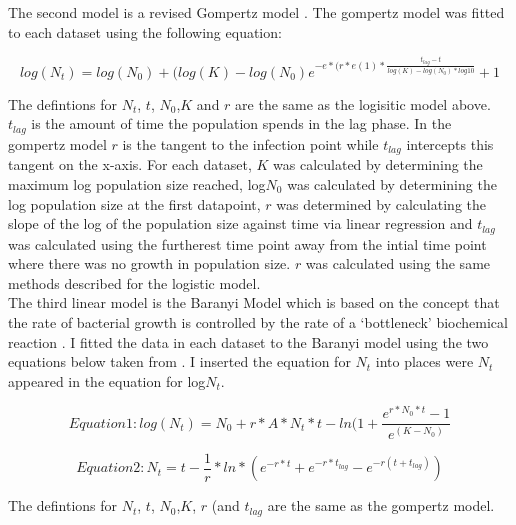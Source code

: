 \documentclass[titlepage]{article}
\begin{document}
The second model is a revised Gompertz model \cite{grijspeerdt1999estimating}. The gompertz model was fitted to each dataset using the following equation: 
  
  
    \begin{equation}
  log(N_{t}) = log(N_{0}) + (log(K) - log(N_{0})e^{-e*(r*e(1)*\frac{t_{lag} - t}{log(K) - log(N_{0})*log{10}}} +1
   \end{equation}
  
  
The defintions for \(N_{t}\), \(t\), \(N_{0}\),\(K\) and \(r\) are the same as the logisitic model above. \(t_{lag}\) is the amount of time the population spends in the lag phase. In the gompertz model \(r\) is the tangent to the infection point while \(t_{lag}\) intercepts this tangent on the x-axis. For each dataset, \(K\) was calculated by determining the maximum log population size reached, log\(N_{0}\) was calculated by determining the log population size at the first datapoint, \(r\) was determined by calculating the slope of the log of the population size against time via linear regression and \(t_{lag}\) was calculated using the furtherest time point away from the intial time point where there was no growth in population size. \(r\) was calculated using the same methods described for the logistic model. \\


The third linear model is the Baranyi Model \cite{baranyi1994dynamic} which is based on the concept that the  rate of  bacterial growth is controlled  by the rate of a ‘bottleneck’ biochemical reaction \cite{buchanan1997simple}. I fitted the data in each dataset to the Baranyi model using the two equations below taken from \cite{pla2015comparison}. I inserted the equation for \(N_{t}\) into places were \(N_{t}\) appeared in the equation for log\(N_{t}\). 
  
    \begin{equation}
    Equation 1:  log(N_{t}) = N_{0}+r*A*N_{t}*t -ln(1 + \frac{e^{r*N_{0}*t}-1}{e^{(K - N_{0})}}
    \end{equation}
    
    \begin{equation}
    Equation 2: N_{t} = t - \frac{1}{r}*ln*(e^{-r*t}+e^{-r*t_{lag}}- e^{-r(t+t_{lag})})
    \end{equation}
  
  
  
  
The defintions for \(N_{t}\), \(t\), \(N_{0}\),\(K\), \(r\) (and \(t_{lag}\) are the same as the gompertz model.  
  
\end{document}
